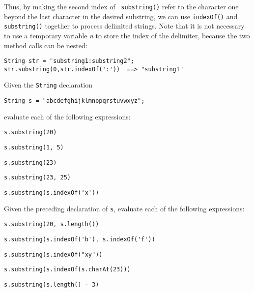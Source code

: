 \noindent Thus, by making the second index of {\tt
substring()} refer to the character one beyond the last character in
the desired substring, we can use {\tt indexOf()} and {\tt
substring()} together to process delimited strings.  Note that it is
not necessary to use a temporary variable {\it n} to store the index
of the delimiter, because the two method calls can be nested:

\begin{jjjlisting}
\begin{lstlisting}
String str = "substring1:substring2";
str.substring(0,str.indexOf(':'))  ==> "substring1"
\end{lstlisting}
\end{jjjlisting}


\begin{SSTUDY}
\item  Given the {\tt String} declaration 

\begin{jjjlisting}
\begin{lstlisting}
String s = "abcdefghijklmnopqrstuvwxyz";
\end{lstlisting}
\end{jjjlisting}

\noindent evaluate each of the following expressions:

\begin{EXRLL}
\begin{multicols}{2}
\item  \verb|s.substring(20)|       
\item  \verb|s.substring(1, 5)|     
\item  \verb|s.substring(23)|       
\item  \verb|s.substring(23, 25)|   
\item  \verb|s.substring(s.indexOf('x'))|
\end{multicols}
\end{EXRLL}


\item  Given the preceding declaration of {\tt s}, evaluate each
of the following expressions:

\begin{EXRLL}
\item  \verb|s.substring(20, s.length())|                  
\item  \verb|s.substring(s.indexOf('b'), s.indexOf('f'))|  
\item  \verb|s.substring(s.indexOf("xy"))|                 
\item  \verb|s.substring(s.indexOf(s.charAt(23)))|         
\item  \verb|s.substring(s.length() - 3)|                  
\end{EXRLL}

\end{SSTUDY}


